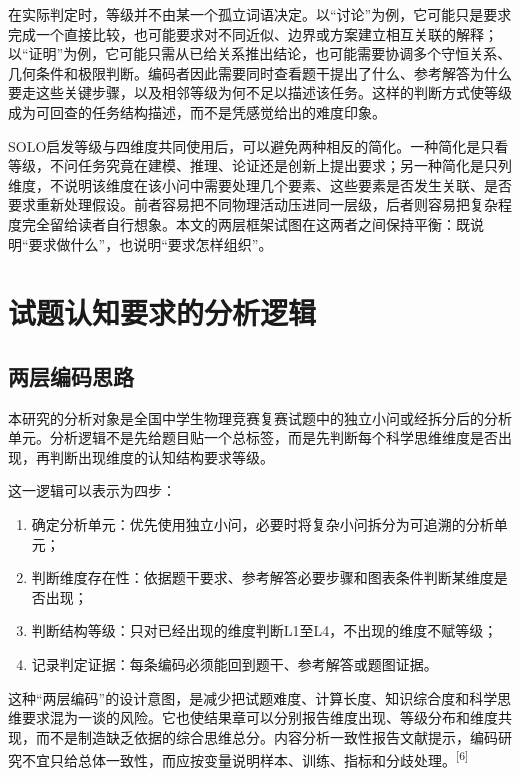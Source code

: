 \documentclass[
  12pt,
  a4paper]{ctexbook}
\providecommand{\tightlist}{%
  \setlength{\itemsep}{0pt}\setlength{\parskip}{0pt}}
\begin{document}
在实际判定时，等级并不由某一个孤立词语决定。以``讨论''为例，它可能只是要求完成一个直接比较，也可能要求对不同近似、边界或方案建立相互关联的解释；以``证明''为例，它可能只需从已给关系推出结论，也可能需要协调多个守恒关系、几何条件和极限判断。编码者因此需要同时查看题干提出了什么、参考解答为什么要走这些关键步骤，以及相邻等级为何不足以描述该任务。这样的判断方式使等级成为可回查的任务结构描述，而不是凭感觉给出的难度印象。

SOLO启发等级与四维度共同使用后，可以避免两种相反的简化。一种简化是只看等级，不问任务究竟在建模、推理、论证还是创新上提出要求；另一种简化是只列维度，不说明该维度在该小问中需要处理几个要素、这些要素是否发生关联、是否要求重新处理假设。前者容易把不同物理活动压进同一层级，后者则容易把复杂程度完全留给读者自行想象。本文的两层框架试图在这两者之间保持平衡：既说明``要求做什么''，也说明``要求怎样组织''。

\section{试题认知要求的分析逻辑}\label{ux8bd5ux9898ux8ba4ux77e5ux8981ux6c42ux7684ux5206ux6790ux903bux8f91}

\subsection{两层编码思路}\label{ux4e24ux5c42ux7f16ux7801ux601dux8def}

本研究的分析对象是全国中学生物理竞赛复赛试题中的独立小问或经拆分后的分析单元。分析逻辑不是先给题目贴一个总标签，而是先判断每个科学思维维度是否出现，再判断出现维度的认知结构要求等级。

这一逻辑可以表示为四步：

\begin{enumerate}
\def\labelenumi{\arabic{enumi}.}
\tightlist
\item
  确定分析单元：优先使用独立小问，必要时将复杂小问拆分为可追溯的分析单元；
\item
  判断维度存在性：依据题干要求、参考解答必要步骤和图表条件判断某维度是否出现；
\item
  判断结构等级：只对已经出现的维度判断L1至L4，不出现的维度不赋等级；
\item
  记录判定证据：每条编码必须能回到题干、参考解答或题图证据。
\end{enumerate}

这种``两层编码''的设计意图，是减少把试题难度、计算长度、知识综合度和科学思维要求混为一谈的风险。它也使结果章可以分别报告维度出现、等级分布和维度共现，而不是制造缺乏依据的综合思维总分。内容分析一致性报告文献提示，编码研究不宜只给总体一致性，而应按变量说明样本、训练、指标和分歧处理。\textsuperscript{[6]}
\end{document}
